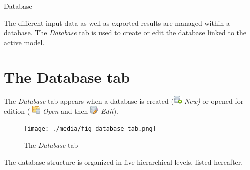\documentclass[
  letterpaper,
  DIV=11,
  numbers=noendperiod]{scrreprt}
\begin{document}
Database

The different input data as well as exported results are managed within
a database. The \emph{Database} tab is used to create or edit the
database linked to the active model.

\hypertarget{the-database-tab}{%
\chapter{The Database tab}\label{the-database-tab}}

The \emph{Database} tab appears when a database is created
(\includegraphics[width=0.17in,height=0.17in]{./figures/fig-icon_database_new.png}
\emph{New)} or opened for edition (
\includegraphics[width=0.17in,height=0.17in]{./figures/fig-icon_database_open.png}
\emph{Open} and then
\includegraphics[width=0.17in,height=0.17in]{./figures/fig-icon_database_edit.png}
\emph{Edit}).

\begin{figure}

{\centering \texttt{[image: ./media/fig-database\_tab.png]}

}

\caption{\label{fig-database_tab}The \emph{Database} tab}

\end{figure}

The database structure is organized in five hierarchical levels, listed
hereafter.
\end{document}
